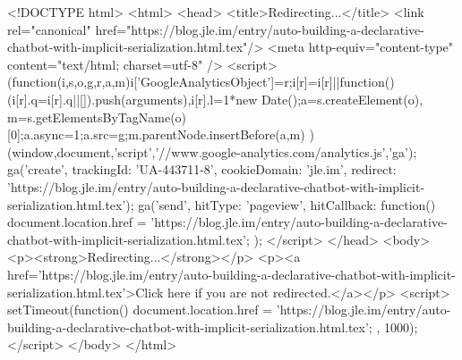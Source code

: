 <!DOCTYPE html>
<html>
<head>
<title>Redirecting...</title>
<link rel="canonical" href="https://blog.jle.im/entry/auto-building-a-declarative-chatbot-with-implicit-serialization.html.tex"/>
<meta http-equiv="content-type" content="text/html; charset=utf-8" />
<script>
(function(i,s,o,g,r,a,m){i['GoogleAnalyticsObject']=r;i[r]=i[r]||function(){
(i[r].q=i[r].q||[]).push(arguments)},i[r].l=1*new Date();a=s.createElement(o),
m=s.getElementsByTagName(o)[0];a.async=1;a.src=g;m.parentNode.insertBefore(a,m)
})(window,document,'script','//www.google-analytics.com/analytics.js','ga');
ga('create', { trackingId: 'UA-443711-8', cookieDomain: 'jle.im', redirect: 'https://blog.jle.im/entry/auto-building-a-declarative-chatbot-with-implicit-serialization.html.tex'});
ga('send', { hitType: 'pageview', hitCallback: function() { document.location.href = 'https://blog.jle.im/entry/auto-building-a-declarative-chatbot-with-implicit-serialization.html.tex'; } });
</script>
</head>
<body>
  <p><strong>Redirecting...</strong></p>
  <p><a href='https://blog.jle.im/entry/auto-building-a-declarative-chatbot-with-implicit-serialization.html.tex'>Click here if you are not redirected.</a></p>
  <script>
    setTimeout(function() { document.location.href = 'https://blog.jle.im/entry/auto-building-a-declarative-chatbot-with-implicit-serialization.html.tex'; }, 1000);
  </script>
</body>
</html>

